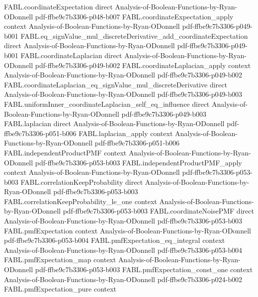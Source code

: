 \begin{theorem}
\proofstep
  {FABL.coordinateExpectation}
  {direct}
  {Analysis-of-Boolean-Functions-by-Ryan-ODonnell}
  {pdf-ffbe9c7b3306-p048-b007}
\proofstep
  {FABL.coordinateExpectation_apply}
  {context}
  {Analysis-of-Boolean-Functions-by-Ryan-ODonnell}
  {pdf-ffbe9c7b3306-p049-b001}
\proofstep
  {FABL.eq_signValue_mul_discreteDerivative_add_coordinateExpectation}
  {direct}
  {Analysis-of-Boolean-Functions-by-Ryan-ODonnell}
  {pdf-ffbe9c7b3306-p049-b001}
\proofstep
  {FABL.coordinateLaplacian}
  {direct}
  {Analysis-of-Boolean-Functions-by-Ryan-ODonnell}
  {pdf-ffbe9c7b3306-p049-b002}
\proofstep
  {FABL.coordinateLaplacian_apply}
  {context}
  {Analysis-of-Boolean-Functions-by-Ryan-ODonnell}
  {pdf-ffbe9c7b3306-p049-b002}
\proofstep
  {FABL.coordinateLaplacian_eq_signValue_mul_discreteDerivative}
  {direct}
  {Analysis-of-Boolean-Functions-by-Ryan-ODonnell}
  {pdf-ffbe9c7b3306-p049-b003}
\proofstep
  {FABL.uniformInner_coordinateLaplacian_self_eq_influence}
  {direct}
  {Analysis-of-Boolean-Functions-by-Ryan-ODonnell}
  {pdf-ffbe9c7b3306-p049-b003}
\proofstep
  {FABL.laplacian}
  {direct}
  {Analysis-of-Boolean-Functions-by-Ryan-ODonnell}
  {pdf-ffbe9c7b3306-p051-b006}
\proofstep
  {FABL.laplacian_apply}
  {context}
  {Analysis-of-Boolean-Functions-by-Ryan-ODonnell}
  {pdf-ffbe9c7b3306-p051-b006}
\proofstep
  {FABL.independentProductPMF}
  {context}
  {Analysis-of-Boolean-Functions-by-Ryan-ODonnell}
  {pdf-ffbe9c7b3306-p053-b003}
\proofstep
  {FABL.independentProductPMF_apply}
  {context}
  {Analysis-of-Boolean-Functions-by-Ryan-ODonnell}
  {pdf-ffbe9c7b3306-p053-b003}
\proofstep
  {FABL.correlationKeepProbability}
  {direct}
  {Analysis-of-Boolean-Functions-by-Ryan-ODonnell}
  {pdf-ffbe9c7b3306-p053-b003}
\proofstep
  {FABL.correlationKeepProbability_le_one}
  {context}
  {Analysis-of-Boolean-Functions-by-Ryan-ODonnell}
  {pdf-ffbe9c7b3306-p053-b003}
\proofstep
  {FABL.coordinateNoisePMF}
  {direct}
  {Analysis-of-Boolean-Functions-by-Ryan-ODonnell}
  {pdf-ffbe9c7b3306-p053-b003}
\proofstep
  {FABL.pmfExpectation}
  {context}
  {Analysis-of-Boolean-Functions-by-Ryan-ODonnell}
  {pdf-ffbe9c7b3306-p053-b004}
\proofstep
  {FABL.pmfExpectation_eq_integral}
  {context}
  {Analysis-of-Boolean-Functions-by-Ryan-ODonnell}
  {pdf-ffbe9c7b3306-p053-b004}
\proofstep
  {FABL.pmfExpectation_map}
  {context}
  {Analysis-of-Boolean-Functions-by-Ryan-ODonnell}
  {pdf-ffbe9c7b3306-p053-b003}
\proofstep
  {FABL.pmfExpectation_const_one}
  {context}
  {Analysis-of-Boolean-Functions-by-Ryan-ODonnell}
  {pdf-ffbe9c7b3306-p024-b002}
\proofstep
  {FABL.pmfExpectation_pure}
  {context}

\end{theorem}
